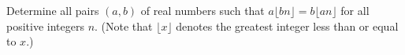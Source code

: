 Determine all pairs $(a,b)$ of real numbers such that $a\lfloor bn \rfloor = b\lfloor an \rfloor$ for all positive integers $n$. (Note that $\lfloor x \rfloor$ denotes the greatest integer less than or equal to $x$.)
